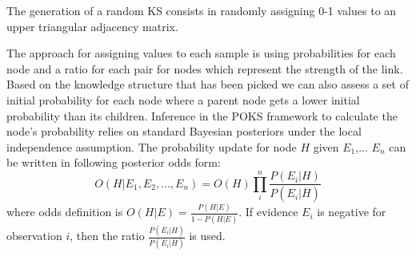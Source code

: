 The generation of a random KS consists in randomly assigning 0-1 values to an upper triangular adjacency matrix. 



The approach for assigning values to each sample is using probabilities for each node and a ratio for each pair for nodes which represent the strength of the link.  Based on the knowledge structure that has been picked  we can also assess a set of initial probability for each node where a parent node gets a lower initial probability than its children. Inference in the POKS framework to calculate the node's probability relies on standard Bayesian posteriors under the local independence assumption. The probability update for node $H$ given $E_1$,... $E_n$ can be written in following posterior odds form:
\begin{equation}
O(H|E_1,E_2, ... , E_n) = O(H) \prod_{i}^{n} \frac{P(E_i|H)}{P(E_i | \overline{H})}
\label{EQPOKSratio}
\end{equation}
where odds definition is $O(H|E) = \frac{P(H|E)}{1-P(H|E)}$. If evidence $E_i$ is negative for observation $i$, then the ratio $\frac{P(\overline{E_i}|H)}{P(\overline{E_i}|\overline{H})}$ is used.


